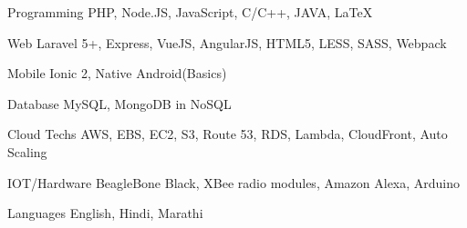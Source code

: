 

\begin{cvskills}

  \cvskill
    {Programming} %
    {PHP, Node.JS, JavaScript, C/C++, JAVA, LaTeX} %

  \cvskill
    {Web} %
    {Laravel 5+, Express, VueJS, AngularJS, HTML5, LESS, SASS, Webpack} %
    
  \cvskill
    {Mobile} %
    {Ionic 2, Native Android(Basics)} %

  \cvskill
    {Database} %
    {MySQL, MongoDB in NoSQL} %

  \cvskill
    {Cloud Techs} %
    {AWS, EBS, EC2, S3, Route 53, RDS, Lambda, CloudFront, Auto Scaling} %

  \cvskill
    {IOT/Hardware} %
    {BeagleBone Black, XBee radio modules, Amazon Alexa, Arduino} %

  \cvskill
    {Languages} %
    {English, Hindi, Marathi} %
    
\end{cvskills}
